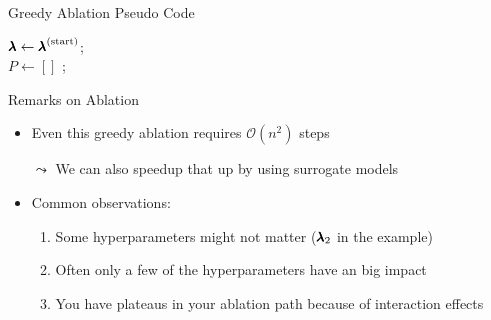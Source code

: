 \begin{frame}[c,fragile]{Greedy Ablation Pseudo Code}

\LinesNotNumbered
\begin{algorithm}[H]
	\BlankLine
	$\pmb{\lambda} \leftarrow  {\pmb{\lambda}}^{(\text{start})}$; \\
	$P \leftarrow [] $ ;\\ 
	\pause
	\pause
	\caption{Greedy Ablation}
	\end{algorithm}
	
\end{frame}
\begin{frame}[c,fragile]{Remarks on Ablation}

\begin{itemize}
	\item Even this greedy ablation requires $\mathcal{O}(n^2)$ steps 
	\pause
	\item[$\leadsto$] We can also speedup that up by using surrogate models\\
	\medskip
	\pause
	\item Common observations:
	\begin{enumerate}
		\item Some hyperparameters might not matter ($\pmb{\lambda}_{2}$ in the example)
		\pause
		\item Often only a few of the hyperparameters have an big impact
		\pause
		\item You have plateaus in your ablation path because of interaction effects
	\end{enumerate}
\end{itemize}

\end{frame}



